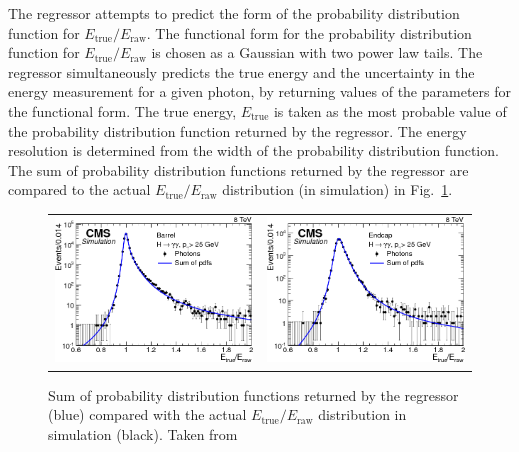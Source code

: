 The regressor attempts to predict the form of the probability distribution function for $E_{\text{true}}/E_{\text{raw}}$.
The functional form for the probability distribution function for $E_{\text{true}}/E_{\text{raw}}$ is chosen as a Gaussian with two power law tails.
The regressor simultaneously predicts the true energy and the uncertainty in the energy measurement for a given photon, by returning values of the parameters for the functional form.
The true energy, $E_{\text{true}}$ is taken as the most probable value of the probability distribution function returned by the regressor.
The energy resolution is determined from the width of the probability distribution function. 
The sum of probability distribution functions returned by the regressor are compared to the actual $E_{\text{true}}/E_{\text{raw}}$ distribution (in simulation) in Fig.~\ref{fig:photon_energy_regression}.
\begin{figure} [h!]
    \centering 
    \begin{tabular}{c c}
        \includegraphics[width=0.48\linewidth]{figures/event_reconstruction_and_selection/figs_recoenergy_Fig-2a.png} &
        \includegraphics[width=0.48\linewidth]{figures/event_reconstruction_and_selection/figs_recoenergy_Fig-2b.png}
    \end{tabular}
    \caption{Sum of probability distribution functions returned by the regressor (blue) compared with the actual $E_{\text{true}}/E_{\text{raw}}$ distribution in simulation (black). Taken from~\cite{Khachatryan:2015iwa}}
    \label{fig:photon_energy_regression}
\end{figure}

